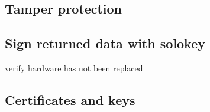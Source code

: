 \documentclass[../../main.tex]{subfiles}
\begin{document}
\subsection{Tamper protection}%
\label{sub:tamper_protection}

\subsection{Sign returned data with solokey}%
\label{sub:sign_returned_data_with_solokey}
verify hardware has not been replaced

\subsection{Certificates and keys}%
\label{sub:certificates_and_keys}



	
\end{document}
